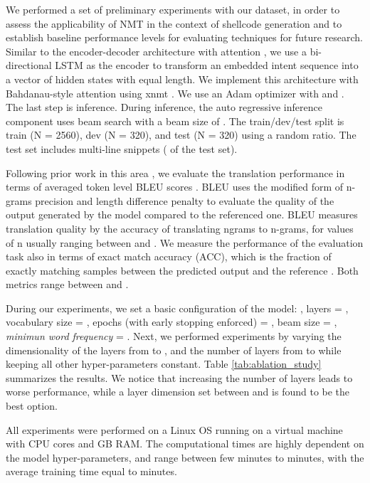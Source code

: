 \documentclass[11pt,a4paper]{article}
\begin{document}
We performed a set of preliminary experiments with our dataset, in order to assess the applicability of NMT in the context of shellcode generation and to establish baseline performance levels for evaluating techniques for future research. 
Similar to the encoder-decoder architecture with attention \cite{bahdanau2014neural}, we use a bi-directional LSTM as the encoder to transform an embedded intent sequence  into a vector  of hidden states with equal length. We implement this architecture with Bahdanau-style attention \cite{bahdanau2014neural} using {\selectfont xnmt} \cite{neubig-etal-2018-xnmt}. We use an Adam optimizer \cite{kingma2014adam} with  and . The last step is inference. During inference, the auto regressive inference component uses beam search with a beam size of . The train/dev/test split is train (N = 2560), dev (N = 320), and test (N = 320) using a random  ratio. The test set includes  multi-line snippets ( of the test set).


Following prior work in this area \cite{DBLP:journals/corr/LingGHKSWB16,DBLP:journals/corr/YinN17,oda2015learning}, we evaluate the translation performance in terms of averaged token level BLEU scores \cite{papineni2002bleu}.
BLEU uses the modified form of n-grams precision and length difference penalty to evaluate the quality of the output generated by the model compared to the referenced one. BLEU measures translation quality by the accuracy of translating ngrams to n-grams, for values of n usually ranging between  and  \cite{han2016machine,munkova2020evaluation}.
We measure the performance of the evaluation task also in terms of exact match accuracy (ACC), which is the fraction of exactly matching samples between the predicted output and the reference  \cite{DBLP:journals/corr/YinN17}. 
Both metrics range between  and .




 
During our experiments, we set a basic configuration of the model: , layers = , vocabulary size = , epochs (with early stopping enforced) = , beam size = , \textit{minimun word frequency} = . Next, we performed experiments by varying the dimensionality of the layers from  to , and the number of layers from  to  while keeping all other hyper-parameters constant. 
Table \ref{tab:ablation_study} summarizes the results. We notice that increasing the number of layers leads to worse performance, while a layer dimension set between  and  is found to be the best option. 

All experiments were performed on a Linux OS running on a virtual machine with  CPU cores and  GB RAM. The computational times are highly dependent on the model hyper-parameters, and range between few minutes to  minutes, with the average training time equal to  minutes.
\end{document}
